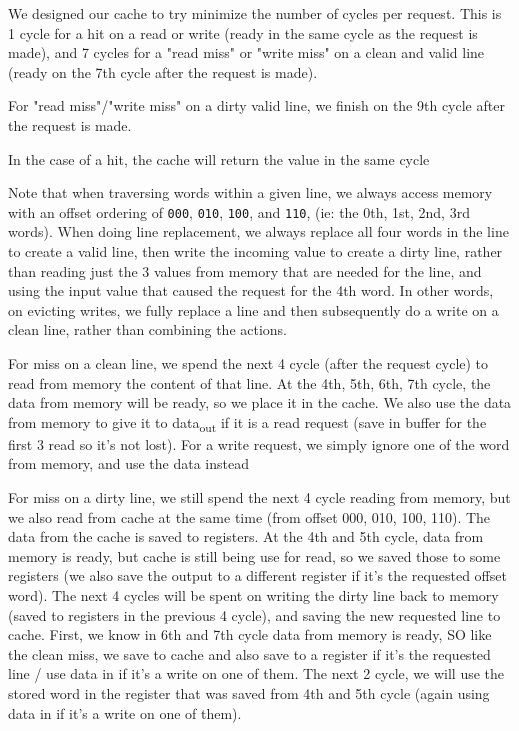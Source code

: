 \documentclass[11pt]{article}
\begin{document}
We designed our cache to try minimize the number of cycles per
request.  This is 1 cycle for a hit on a read or write (ready in the
same cycle as the request is made), and 7 cycles for a "read miss" or
"write miss" on a clean and valid line (ready on the 7th cycle after
the request is made).

For "read miss"/"write miss" on a dirty valid line, we finish on the
9th cycle after the request is made.

In the case of a hit, the cache will return the value in the same
cycle

Note that when traversing words within a given line, we always access
memory with an offset ordering of \texttt{000}, \texttt{010}, \texttt{100}, and \texttt{110}, (ie:
the 0th, 1st, 2nd, 3rd words). When doing line replacement, we always
replace all four words in the line to create a valid line, then write
the incoming value to create a dirty line, rather than reading just
the 3 values from memory that are needed for the line, and using the
input value that caused the request for the 4th word. In other words,
on evicting writes, we fully replace a line and then subsequently do a
write on a clean line, rather than combining the actions.

For miss on a clean line, we spend the next 4 cycle (after the request
cycle) to read from memory the content of that line.  At the 4th, 5th,
6th, 7th cycle, the data from memory will be ready, so we place it in
the cache. We also use the data from memory to give it to data\textsubscript{out} if
it is a read request (save in buffer for the first 3 read so it's not
lost). For a write request, we simply ignore one of the word from
memory, and use the data instead

For miss on a dirty line, we still spend the next 4 cycle reading from
memory, but we also read from cache at the same time (from offset 000,
010, 100, 110). The data from the cache is saved to registers.  At the
4th and 5th cycle, data from memory is ready, but cache is still being
use for read, so we saved those to some registers (we also save the
output to a different register if it's the requested offset word).
The next 4 cycles will be spent on writing the dirty line back to
memory (saved to registers in the previous 4 cycle), and saving the
new requested line to cache. First, we know in 6th and 7th cycle data
from memory is ready, SO like the clean miss, we save to cache and
also save to a register if it's the requested line / use data in if
it's a write on one of them. The next 2 cycle, we will use the stored
word in the register that was saved from 4th and 5th cycle (again
using data in if it's a write on one of them).
\end{document}
